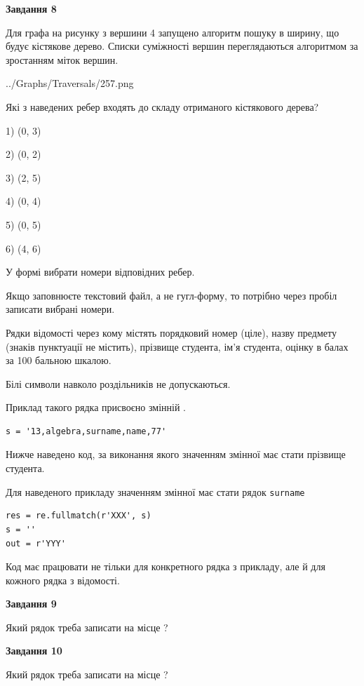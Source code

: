 \documentclass[12pt, ukrainian]{article}
\def\code#1{\Verb!#1!}
\begin{document}
{\begin {large}
{\begin {center}\textbf{Завдання 8}\end {center}}\par
Для графа на рисунку з вершини 4 запущено алгоритм пошуку в ширину, що будує кістякове дерево. Списки суміжності вершин переглядаються алгоритмом за зростанням міток вершин.\par
\begin{center}
	{../Graphs/Traversals/257.png}
\end{center}
\par Які з наведених ребер входять до складу отриманого кістякового дерева?\par
1) (0, 3)\par
2) (0, 2)\par
3) (2, 5)\par
4) (0, 4)\par
5) (0, 5)\par
6) (4, 6)\par
{\vskip 15pt} У формі вибрати номери відповідних ребер.


Якщо заповнюєте текстовий файл, а не гугл-форму, то потрібно через пробіл записа\-ти вибрані номери.\par
\newpage


Рядки відомості через кому містять порядковий номер (ціле), назву предмету (зна\-ків пунктуації не містить), прізвище студента, ім'я студента, оцінку в балах за 100 бальною шкалою.

Білі символи навколо роздільників не допускаються.

Приклад такого рядка присвоєно змінній .



\begin{verbatim}
s = '13,algebra,surname,name,77'
\end{verbatim}


Нижче наведено код, за виконання якого значенням змінної  має стати прізвище студента.

Для наведеного прикладу значенням змінної  має стати рядок \code{surname}



\begin{verbatim}
res = re.fullmatch(r'XXX', s)
s = ''
out = r'YYY'
\end{verbatim}


Код має працювати не тільки для конкретного рядка з прикладу, але й для кожного рядка з відомості.

{\begin {center}\textbf{Завдання 9}\end {center}}\par
Який рядок треба записати на місце  ?\par
\vspace{5mm}


{\begin {center}\textbf{Завдання 10}\end {center}}\par
Який рядок треба записати на місце  ?\par


\newpage


\end {large}}
\end{document}
